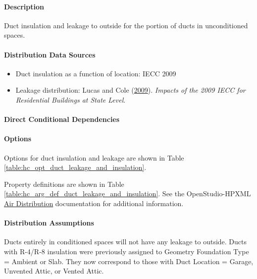 \paragraph{Description}
% 
Duct insulation and leakage to outside for the portion of ducts in unconditioned spaces.

\paragraph{Distribution Data Sources}
% 
\begin{itemize}
\item Duct insulation as a function of location: IECC 2009 
\item Leakage 
distribution: Lucas and Cole (\href{https://www.pnnl.gov/main/publications/external/technical_reports/PNNL-18545.pdf}{2009}). \textit{Impacts of the 2009 IECC for Residential Buildings at State Level}. 
\end{itemize}

\paragraph{Direct Conditional Dependencies}


\paragraph{Options}
Options for duct insulation and leakage are shown in Table \ref{table:hc_opt_duct_leakage_and_insulation}.



Property definitions are shown in Table \ref{table:hc_arg_def_duct_leakage_and_insulation}. See the OpenStudio-HPXML \href{https://openstudio-hpxml.readthedocs.io/en/v1.10.0/workflow_inputs.html#air-distribution}{Air Distribution} documentation for additional information.



\paragraph{Distribution Assumptions}
% 
Ducts entirely in conditioned spaces will not have any leakage to outside. Ducts with R-4/R-8 insulation were previously assigned to Geometry Foundation Type = Ambient or Slab. They now correspond to those with Duct Location = Garage, Unvented Attic, or Vented Attic. 
